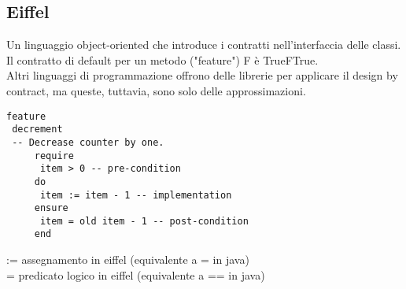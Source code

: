 \subsection{Eiffel}
Un linguaggio object-oriented che introduce i contratti nell'interfaccia delle classi. Il contratto di default per un metodo ("feature") F è {True}F{True}.\\
Altri linguaggi di programmazione offrono delle librerie per applicare il design by contract, ma queste, tuttavia, sono solo delle approssimazioni.
\begin{verbatim}
feature
 decrement
 -- Decrease counter by one.
     require
      item > 0 -- pre-condition
     do
      item := item - 1 -- implementation 
     ensure
      item = old item - 1 -- post-condition
     end
\end{verbatim}
:= assegnamento in eiffel (equivalente a = in java)\\
= predicato logico in eiffel (equivalente a == in java)\\\\

